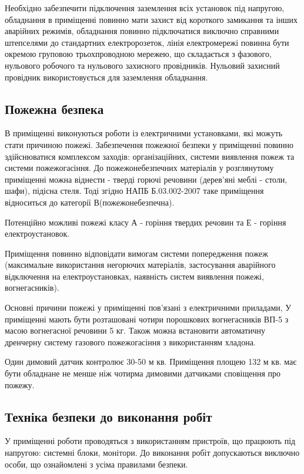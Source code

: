     Необхідно забезпечити підключення заземлення всіх установок під напругою, обладнання в приміщенні повинно мати захист від короткого замикання та інших аварійних режимів, обладнання повинно підключатися виключно справними штепселями до стандартних електророзеток, лінія електромережі повинна бути окремою груповою трьохпроводною мережею, що складається з фазового, нульового робочого та нульового захисного провідників. Нульовий захисний провідник використовується для заземлення обладнання.

\subsection{Пожежна безпека}
    В приміщенні виконуються роботи із електричними установками, які можуть стати причиною пожежі. Забезпечення пожежної безпеки у приміщенні повинно здійснюватися комплексом заходів: організаційних, системи виявлення пожеж та системи пожежогасіння.
    До пожежонебезпечних матеріалів у розглянутому приміщенні можна віднести - тверді горючі речовини (дерев'яні меблі - столи, шафи), підісна стеля. Тоді згідно НАПБ Б.03.002-2007\cite{lab-napb} таке приміщення відноситься до категорії В(пожежонебезпечна).

    Потенційно можливі пожежі класу А - горіння твердих речовин та Е - горіння електроустановок.

    Приміщення повинно відповідати вимогам системи попередження пожеж (максимальне використання негорючих матеріалів, застосування аварійного відключення на електроустановках, наявність систем виявлення пожежі, вогнегасників).

    Основні причини пожежі у приміщенні пов'язані з електричними приладами, У приміщенні мають бути розташовані чотири порошкових вогнегасників ВП-5 з масою вогнегасної речовини 5 кг. Також можна встановити автоматичну дренчерну систему газового пожежогасіння з використанням хладона.

    Один димовий датчик контролює 30-50 м кв. Приміщення площею 132 м кв. має бути обладнане не менше ніж чотирма димовими датчиками сповіщення про пожежу.

\subsection{Техніка безпеки до виконання робіт}
    У приміщенні роботи проводяться з використанням пристроїв, що працюють під напругою: системні блоки, монітори. До виконання робіт допускаються виключно особи, що ознайомлені з усіма правилами безпеки.

